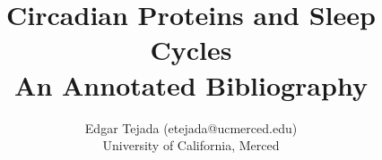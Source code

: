 \documentclass [12pt]{article}
\title{Circadian Proteins and Sleep Cycles\\\medskip An Annotated Bibliography}
\author{Edgar Tejada (etejada@ucmerced.edu)\\University of California, Merced}
\begin{document}
\maketitle
\nocite{*}

%
%
%



%
%
%
%
%
%
%
\end{document}
